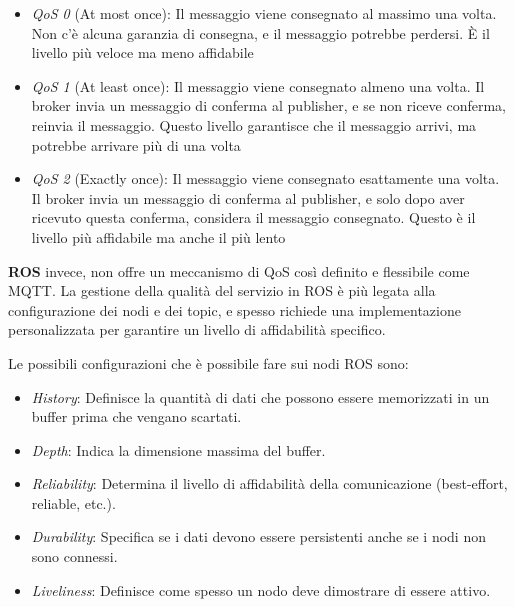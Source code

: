 \begin{itemize}
  \item \textit{QoS 0} (At most once): Il messaggio viene consegnato al massimo una volta. Non c'è alcuna garanzia di consegna, e il messaggio potrebbe perdersi. È il livello più veloce ma meno affidabile
  \item \textit{QoS 1} (At least once): Il messaggio viene consegnato almeno una volta. Il broker invia un messaggio di conferma al publisher, e se non riceve conferma, reinvia il messaggio. Questo livello garantisce che il messaggio arrivi, ma potrebbe arrivare più di una volta
  \item \textit{QoS 2} (Exactly once): Il messaggio viene consegnato esattamente una volta. Il broker invia un messaggio di conferma al publisher, e solo dopo aver ricevuto questa conferma, considera il messaggio consegnato. Questo è il livello più affidabile ma anche il più lento
\end{itemize}

\noindent \textbf{ROS} invece, non offre un meccanismo di QoS così definito e flessibile come MQTT. La gestione della qualità del servizio in ROS è più legata alla configurazione dei nodi e dei topic, e spesso richiede una implementazione personalizzata per garantire un livello di affidabilità specifico. 

Le possibili configurazioni che è possibile fare sui nodi ROS sono:
\begin{itemize}
  \item \textit{History}: Definisce la quantità di dati che possono essere memorizzati in un buffer prima che vengano scartati.
  \item \textit{Depth}: Indica la dimensione massima del buffer.
  \item \textit{Reliability}: Determina il livello di affidabilità della comunicazione (best-effort, reliable, etc.).
  \item \textit{Durability}: Specifica se i dati devono essere persistenti anche se i nodi non sono connessi.
  \item \textit{Liveliness}: Definisce come spesso un nodo deve dimostrare di essere attivo.
\end{itemize}
